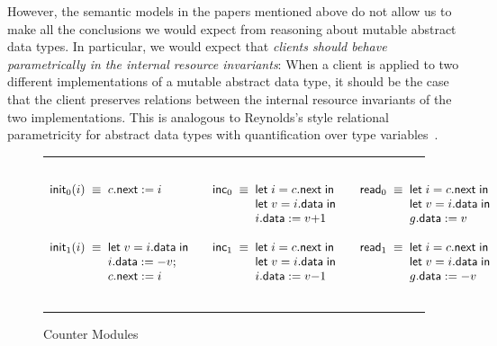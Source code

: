 \documentclass{LMCS}
\newcommand{\mlet}[1]{\mathsf{let}\;{#1}\;\mathsf{in}}
\newcommand{\init}{\mathsf{init}}
\newcommand{\inc}{\mathsf{inc}}
\newcommand{\mread}{\mathsf{read}}
\newcommand{\data}{\mathsf{data}}
\newcommand{\mnext}{\mathsf{next}}
\begin{document}
However, the semantic models in the papers mentioned 
above do not allow us to make all the conclusions we would expect from
reasoning about mutable abstract data types. 
In particular, we would expect that \emph{clients should behave parametrically 
in the internal resource invariants}: When a client is applied to 
two different implementations of a mutable abstract data type, 
it should be the case that the client preserves 
relations between the internal resource invariants of the two
implementations. This is analogous to Reynolds's style 
relational parametricity for abstract data types with quantification over
type variables~\cite{reynolds}.

\begin{figure*}[t]
\hrule
$\,$

$$
\begin{array}{r@{\;\;}c@{\;\;}l@{\qquad}r@{\;\;}c@{\;\;}l@{\qquad}r@{\;\;}c@{\;\;}l}
\init_0(i) & \equiv & {c.\mnext := i}
&
\inc_0 & \equiv & 
\begin{array}[t]{@{}l@{}}
  \mlet{i = c.\mnext} \\
  \mlet{v = i.\data} \\
  {i.\data := v{+}1}
\end{array}
&
\mread_0 & \equiv &
\begin{array}[t]{@{}l@{}} 
\mlet{i = c.\mnext} \\
\mlet{v = i.\data} \\
{g.\data := v}
\end{array}
\\
\\
\init_1(i) & \equiv & 
\begin{array}[t]{@{}l@{}}
 \mlet{v = i.\data} \\
 {i.\data := {-}v;} \\
 {c.\mnext := i}
\end{array}
&
\inc_1 & \equiv & 
\begin{array}[t]{@{}l@{}}
  \mlet{i = c.\mnext} \\
  \mlet{v = i.\data} \\
  {i.\data := v{-}1}
\end{array}
&
\mread_1 & \equiv &
\begin{array}[t]{@{}l@{}} 
\mlet{i = c.\mnext} \\
\mlet{v = i.\data} \\
{g.\data := -v}
\\
\\
\end{array}
\end{array}
$$

\hrule
\caption{Counter Modules}
\label{fig:counters}
\end{figure*}
\end{document}
